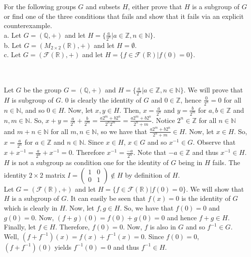 For the following groups $G$ and subsets $H$, either prove that $H$ is a subgroup of $G$ or find one
of the three conditions that fails and show that it fails via an explicit counterexample.\\

a. Let $G=(\mathbb{Q},+)$ and let $H=\{\frac{a}{2^n}|a\in\mathbb{Z},n\in\mathbb{N}\}$.\\

b. Let $G=(M_{2\times2}(\mathbb{R}),+)$ and let $H=\emptyset$.\\

c. Let $G=(\mathcal{F}(\mathbb{R}),+)$ and let $H=\{f\in\mathcal{F}(\mathbb{R})|f(0)=0\}$.\\\\

\begin{solution}\renewcommand{\qedsymbol}{}\ \\
    Let $G$ be the group $G=(\mathbb{Q},+)$ and $H=\{\frac{a}{2^n}|a\in\mathbb{Z},n\in\mathbb{N}\}$. We
    will prove that $H$ is subgroup of $G$. $0$ is clearly the identity of $G$ and $0\in\mathbb{Z}$,
    hence $\frac{0}{2^n}=0$ for all $n\in\mathbb{N}$, and so $0\in H$. Now, let $x,y\in H$. Then,
    $x=\frac{a}{2^n}$ and $y=\frac{b}{2^m}$ for $a,b\in\mathbb{Z}$ and $n,m\in\mathbb{N}$. So,
    $x+y=\frac{a}{2^n}+\frac{b}{2^m}=\frac{a2^m+b2^n}{2^n2^m}=\frac{a2^m+b2^n}{2^n+m}$. Notice
    $2^n\in\mathbb{Z}$ for all $n\in\mathbb{N}$ and $m+n\in\mathbb{N}$ for all $m,n\in\mathbb{N}$, so we
    have that $\frac{a2^m+b2^n}{2^n+m}\in H$. Now, let $x\in H$. So, $x=\frac{a}{2^n}$ for
    $a\in\mathbb{Z}$ and $n\in\mathbb{N}$. Since $x\in H$, $x\in G$ and so $x^{-1}\in G$. Observe that
    $x+x^{-1}=\frac{a}{2^n}+x^{-1}=0$. Therefore $x^{-1}=\frac{-a}{2^n}$. Note that $-a\in\mathbb{Z}$
    and thus $x^{-1}\in H$.\\

    $H$ is not a subgroup as condition one for the identity of $G$ being in $H$ fails. The identity
    $2\times2$ matrix $I=\left ( \begin{array}{cc} 1 & 0\\ 0 & 1 \end{array} \right )\notin H$ by
    definition of $H$.\\

    Let $G=(\mathcal{F}(\mathbb{R}),+)$ and let $H=\{f\in\mathcal{F}(\mathbb{R})|f(0)=0\}$. We will show
    that $H$ is a subgroup of $G$. It can easily be seen that $f(x)=0$ is the identity of $G$ which is
    clearly in $H$. Now, let $f,g\in H$. So, we have that $f(0)=0$ and $g(0)=0$. Now,
    $(f+g)(0)=f(0)+g(0)=0$ and hence $f+g\in H$. Finally, let $f\in H$. Therefore, $f(0)=0$. Now, $f$ is
    also in $G$ and so $f^{-1}\in G$. Well, $(f+f^{-1})(x)=f(x)+f^{-1}(x)=0$. Since $f(0)=0$,
    $(f+f^{-1})(0)$ yields $f^{-1}(0)=0$ and thus $f^{-1}\in H$.

\end{solution}